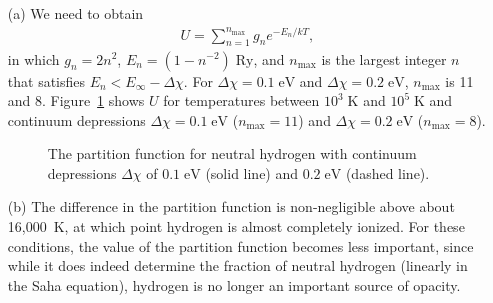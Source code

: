 \begin{problem}
\begin{enumerate}
\item[(a)]
We need to obtain
\begin{align}
U = \sum_{n=1}^{n_\mathrm{max}} g_n e^{-E_n/kT},
\end{align}
in which $g_n = 2n^2$, $E_n = (1 - n^{-2})\;\mathrm{Ry}$, and $n_\mathrm{max}$ is the largest integer $n$ that satisfies $E_n < E_\infty - \Delta\chi$. For $\Delta\chi = 0.1\;\mathrm{eV}$ and $\Delta\chi = 0.2\;\mathrm{eV}$, $n_\mathrm{max}$ is 11 and 8.
Figure~\ref{figure:partition-function-problem} shows $U$ for  temperatures between $10^3\;\mathrm{K}$ and $10^5\;\mathrm{K}$ and continuum depressions $\Delta\chi = 0.1\;\mathrm{eV}$ ($n_\mathrm{max} = 11$) and $\Delta\chi = 0.2\;\mathrm{eV}$ ($n_\mathrm{max} = 8$).

\begin{figure}[pb]
\footnotesize
{}
\caption{The partition function for neutral hydrogen with continuum depressions $\Delta\chi$ of $0.1\;\mathrm{eV}$ (solid line) and $0.2\;\mathrm{eV}$ (dashed line).}
\label{figure:partition-function-problem}
\end{figure}

\item[(b)]
The difference in the partition function is non-negligible above about 16,000~K, at which point hydrogen is almost completely ionized. For these conditions, the value of the partition function becomes less important, since while it does indeed determine the fraction of neutral hydrogen (linearly in the Saha equation), hydrogen is no longer an important source of opacity.
\end{enumerate}
\end{problem}

